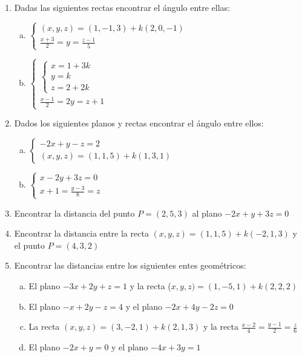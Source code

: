 \documentclass[11pt,a4paper]{article}
\begin{document}
\begin{enumerate}
\item Dadas las siguientes rectas encontrar el \'angulo entre ellas:

\begin{enumerate}[a)]
\item $\begin{cases}
  (x, y, z) = (1, -1, 3) + k (2, 0, -1) \\
  \frac{x + 3}{2} = y = \frac{z - 1}{5} 
\end{cases}$
\item $\begin{cases}
 \begin{cases}
  x = 1 + 3k \\
  y = k \\
  z = 2 + 2k
 \end{cases} \\
  \frac{x - 1}{2} = 2y = z + 1 
\end{cases}$
\end{enumerate}

\item Dados los siguientes planos y rectas encontrar el \'angulo entre ellos:

\begin{enumerate}[a)]
\item $\begin{cases}
  -2x + y - z = 2 \\
  (x, y, z) = (1, 1, 5) + k (1, 3, 1)
\end{cases}$  
\item $\begin{cases}
  x - 2y + 3z = 0 \\
  x + 1 = \frac{y - 3}{8} = z
\end{cases}$
\end{enumerate}

\item Encontrar la distancia del punto $P = (2, 5, 3)$ al plano $-2x + y + 3z = 0$

\item Encontrar la distancia entre la recta $(x, y, z) = (1, 1, 5) + k (-2, 1, 3)$ y el punto $P = (4, 3, 2)$

\item Encontrar las distancias entre los siguientes entes geom\'etricos:

\begin{enumerate}[a)]
\item El plano $-3x + 2y + z = 1$ y la recta ($x, y, z) = (1, -5, 1) + k (2, 2, 2)$
\item El plano $-x + 2y - z = 4$ y el plano $-2x + 4y - 2z = 0$
\item La recta $(x, y, z) = (3, -2, 1) + k (2, 1, 3)$ y la recta $\frac{x - 2}{4} = \frac{y - 1}{2} = \frac{z}{6}$
\item El plano $-2x + y = 0$ y el plano $-4x + 3y = 1$
\end{enumerate}


\end{enumerate}
\end{document}
